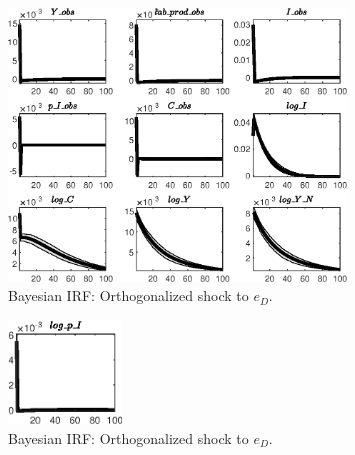 \begin{figure}[H]
\centering 
\includegraphics[width=0.80\textwidth]{BRS_growth_alt/Output/BRS_growth_alt_Bayesian_IRF_e_D_1}
\caption{Bayesian IRF: Orthogonalized shock to ${e_D}$.}
\label{Fig:BayesianIRF:e_D:1}
\end{figure}
 
\begin{figure}[H]
\centering 
\includegraphics[width=0.27\textwidth]{BRS_growth_alt/Output/BRS_growth_alt_Bayesian_IRF_e_D_2}
\caption{Bayesian IRF: Orthogonalized shock to ${e_D}$.}
\label{Fig:BayesianIRF:e_D:2}
\end{figure}
 
